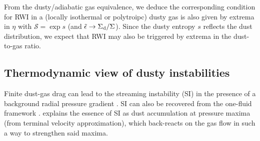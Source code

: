 From the dusty/adiabatic gas equivalence, we deduce the corresponding
condition for RWI in a (locally isothermal or polytroipc) dusty gas is
also given by extrema in $\eta$ with $\mathcal{S} = \exp{s}$ (and
$\tilde{\epsilon}\to \Sigma_\mathrm{d}/\Sigma$). Since
the dusty entropy $s$ reflects the dust distribution, we expect that
RWI may also be triggered by extrema in  the dust-to-gas ratio. 



\subsection{Thermodynamic view of dusty instabilities}

Finite dust-gas drag can lead to the streaming instability (SI) in the
presence of a background radial pressure gradient \citep{youdin05a}.    
SI can also be recovered from the one-fluid framework
\citep{laibe14}. \cite{jacquet11} explains the essence of SI as dust
accumulation at pressure maxima (from terminal velocity
approximation), which back-reacts on the gas flow in 
such a way to strengthen said maxima. 









